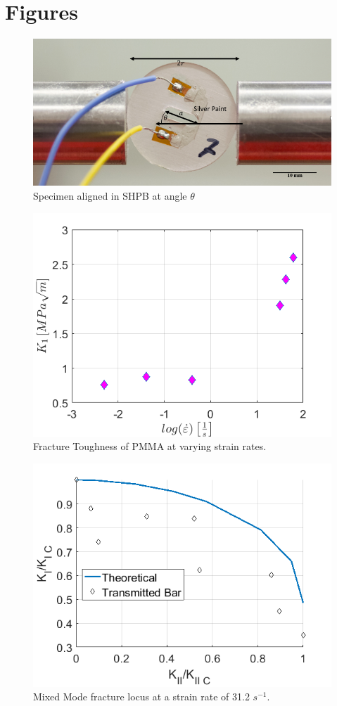 \documentclass[12pt]{article}
\begin{document}
\section{Figures} %

\begin{figure}[H]
	\centering
	\includegraphics[width=.8\textwidth,scale=1]{LastImg.png}
	\caption{Specimen aligned in SHPB at angle $\theta$}
	\label{fig:Spec}
\end{figure}

\begin{figure}[H]
	\centering
	\includegraphics[width=.67\textwidth,scale=1]{Goal1.png}
	\caption{Fracture Toughness of PMMA at varying strain rates.}
	\label{fig:Goal1}
\end{figure}

\begin{figure}[H]
	\centering
	\includegraphics[width=.67\textwidth,scale=1]{Goal2b.png}
	\caption{Mixed Mode fracture locus at a strain rate of 31.2 $s^{-1}$.}
	\label{fig:Goal2}
\end{figure}
\end{document}
